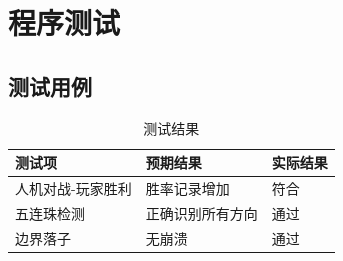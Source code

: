 \documentclass[UTF8]{ctexart}
\begin{document}
\section{程序测试}
\subsection{测试用例}
\begin{table}[h]
    \centering
    \begin{tabular}{lll}
        \toprule
        \textbf{测试项} & \textbf{预期结果} & \textbf{实际结果} \\
        \midrule
        人机对战-玩家胜利 & 胜率记录增加 & 符合 \\
        五连珠检测 & 正确识别所有方向 & 通过 \\
        边界落子 & 无崩溃 & 通过 \\
        \bottomrule
    \end{tabular}
    \caption{测试结果}
\end{table}
\end{document}

